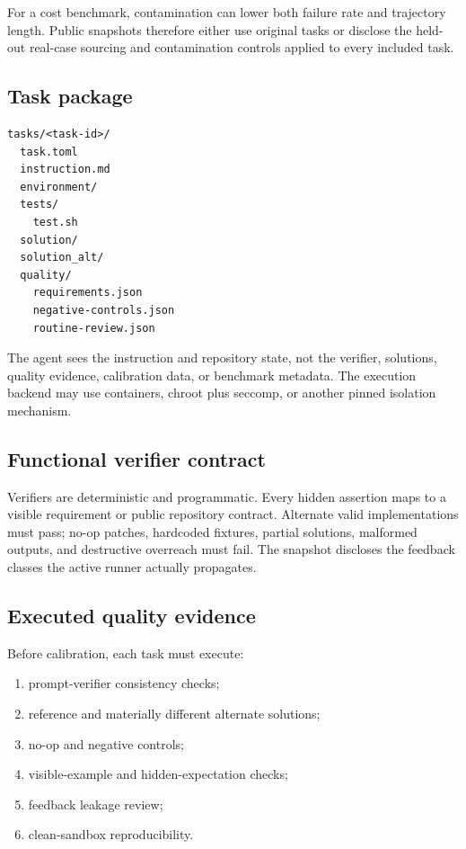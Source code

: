 \documentclass[11pt]{article}
\begin{document}
For a cost benchmark, contamination can lower both failure rate and trajectory length. Public snapshots therefore either use original tasks or disclose the held-out real-case sourcing and contamination controls applied to every included task.

\subsection{Task package}\hypertarget{54-task-package}{}\label{54-task-package}

\begin{lstlisting}[showspaces=false,showtabs=false,basicstyle=\ttfamily\footnotesize,columns=fixed,frame=tlbr]
tasks/<task-id>/
  task.toml
  instruction.md
  environment/
  tests/
    test.sh
  solution/
  solution_alt/
  quality/
    requirements.json
    negative-controls.json
    routine-review.json

\end{lstlisting}   %

The agent sees the instruction and repository state, not the verifier, solutions, quality evidence, calibration data, or benchmark metadata. The execution backend may use containers, chroot plus seccomp, or another pinned isolation mechanism.

\subsection{Functional verifier contract}\hypertarget{55-functional-verifier-contract}{}\label{55-functional-verifier-contract}

Verifiers are deterministic and programmatic. Every hidden assertion maps to a visible requirement or public repository contract. Alternate valid implementations must pass; no-op patches, hardcoded fixtures, partial solutions, malformed outputs, and destructive overreach must fail. The snapshot discloses the feedback classes the active runner actually propagates.

\subsection{Executed quality evidence}\hypertarget{56-executed-quality-evidence}{}\label{56-executed-quality-evidence}

Before calibration, each task must execute:

\begin{enumerate}
\item{} prompt-verifier consistency checks;
\item{} reference and materially different alternate solutions;
\item{} no-op and negative controls;
\item{} visible-example and hidden-expectation checks;
\item{} feedback leakage review;
\item{} clean-sandbox reproducibility.
\end{enumerate}
\end{document}

